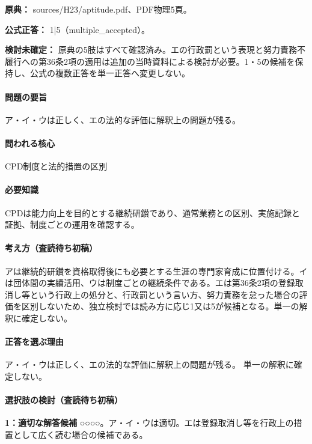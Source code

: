 \noindent\textbf{原典：} sources/H23/aptitude.pdf、PDF物理5頁。

\textbf{公式正答：} 1|5（multiple\_accepted）。

\par\textbf{検討未確定：} 原典の5肢はすべて確認済み。エの行政罰という表現と努力責務不履行への第36条2項の適用は追加の当時資料による検討が必要。1・5の候補を保持し、公式の複数正答を単一正答へ変更しない。

\paragraph{問題の要旨} ア・イ・ウは正しく、エの法的な評価に解釈上の問題が残る。

\paragraph{問われる核心} CPD制度と法的措置の区別

\paragraph{必要知識} CPDは能力向上を目的とする継続研鑚であり、通常業務との区別、実施記録と証拠、制度ごとの運用を確認する。

\paragraph{考え方（査読待ち初稿）} アは継続的研鑚を資格取得後にも必要とする生涯の専門家育成に位置付ける。イは団体間の実績活用、ウは制度ごとの継続条件である。エは第36条2項の登録取消し等という行政上の処分と、行政罰という言い方、努力責務を怠った場合の評価を区別しないため、独立検討では読み方に応じ1又は5が候補となる。単一の解釈に確定しない。

\paragraph{正答を選ぶ理由} ア・イ・ウは正しく、エの法的な評価に解釈上の問題が残る。 単一の解釈に確定しない。

\paragraph{選択肢の検討（査読待ち初稿）}\mbox{}\par

\noindent\textbf{1：適切な解答候補} ○○○○。ア・イ・ウは適切。エは登録取消し等を行政上の措置として広く読む場合の候補である。\par

